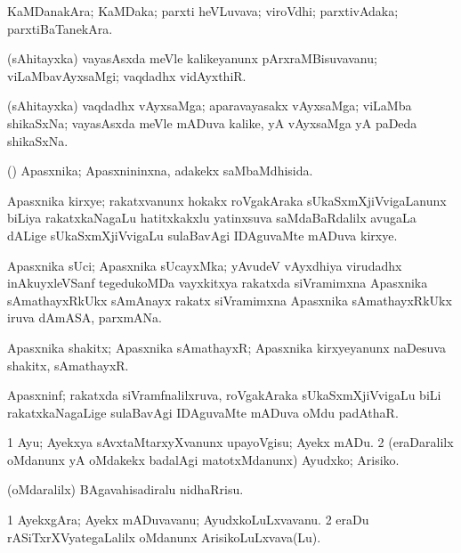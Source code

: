 \bentry
{}
\gl{\nA}
\bmng
KaMDanakAra; KaMDaka; parxti heVLuvava; viroVdhi; parxtivAdaka; parxtiBaTanekAra. 
\emng
\eentry

\bentry
{}
\gl{\nA}
\bmng
(sAhitayxka) vayasAsxda meVle kalikeyanunx pArxraMBisuvavanu; viLaMbavAyxsaMgi; vaqdadhx vidAyxthiR. 
\emng
\eentry

\bentry
{}
\gl{\nA}
\bmng
(sAhitayxka) vaqdadhx vAyxsaMga; aparavayasakx vAyxsaMga; viLaMba shikaSxNa; vayasAsxda meVle mADuva kalike, yA vAyxsaMga yA paDeda shikaSxNa. 
\emng
\eentry


\bentry
{}
\gl{\gu}
\bmng
(\veYshA) Apasxnika; Apasxnininxna, adakekx saMbaMdhisida. 
\emng
\eentry

\bentry
{}
\gl{\nA}
\bmng
Apasxnika kirxye; rakatxvanunx hokakx roVgakAraka sUkaSxmXjiVvigaLanunx biLiya rakatxkaNagaLu hatitxkakxlu yatinxsuva saMdaBaRdalilx avugaLa dALige sUkaSxmXjiVvigaLu sulaBavAgi IDAguvaMte mADuva kirxye. 
\emng
\eentry

\bentry
{}
\gl{\nA}
\bmng
Apasxnika sUci; Apasxnika sUcayxMka; yAvudeV vAyxdhiya virudadhx inAkuyxleVSanf tegedukoMDa vayxkitxya rakatxda siVramimxna Apasxnika sAmathayxRkUkx sAmAnayx rakatx siVramimxna Apasxnika sAmathayxRkUkx iruva dAmASA, parxmANa. 
\emng
\eentry

\bentry
{}
\gl{\nA}
\bmng
Apasxnika shakitx; Apasxnika sAmathayxR; Apasxnika kirxyeyanunx naDesuva shakitx, sAmathayxR. 
\emng
\eentry

\bentry
{}
\gl{\nA}
\bmng
Apasxninf; rakatxda siVramfnalilxruva, roVgakAraka sUkaSxmXjiVvigaLu biLi rakatxkaNagaLige sulaBavAgi IDAguvaMte mADuva oMdu padAthaR. 
\emng
\eentry

\bentry
{}
\gl{\akirx}
\bmng
\bnum
\num{1} Ayu; Ayekxya sAvxtaMtarxyXvanunx upayoVgisu; Ayekx mADu. 
\num{2} (eraDaralilx oMdanunx yA oMdakekx badalAgi matotxMdanunx) Ayudxko; Arisiko. 
\enum
\emng

\noindent
\gl{\pagu}
\bmng
{} (oMdaralilx) BAgavahisadiralu nidhaRrisu. 
\emng
\eentry

\bentry
{}
\gl{\nA}
\bmng
\bnum
\num{1} AyekxgAra; Ayekx mADuvavanu; AyudxkoLuLxvavanu. 
\num{2} eraDu rASiTxrXVyategaLalilx oMdanunx ArisikoLuLxvava(Lu). 
\enum
\emng
\eentry

